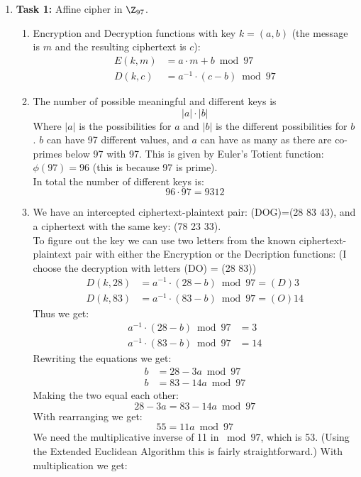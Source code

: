 \documentclass{article}
\begin{document}
\homeworktitle

\begin{enumerate}[label={}]
	\item \textbf{Task 1:} Affine cipher in $\Z_{97}$.
	\begin{enumerate}
		\item Encryption and Decryption functions with key $k=(a,b)$ (the message is $m$ and the resulting ciphertext is $c$):
		\begin{align*}
			E(k, m) &= a \cdot m + b \bmod 97\\
			D(k, c) &= a^{-1} \cdot (c - b) \bmod 97
		\end{align*}
		\item The number of possible meaningful and different keys is \[ \lvert a \rvert \cdot \lvert b \rvert \]
		Where $\lvert a \rvert$ is the possibilities for $a$ and $\lvert b \rvert$ is the different possibilities for $b$. $b$ can have 97 different values, and $a$ can have as many as there are co-primes below 97 with 97. This is given by Euler's Totient function: $\phi(97) = 96$ (this is because 97 is prime).\\
		In total the number of different keys is: 
		\[96 \cdot 97 = 9312\]
		\item We have an intercepted ciphertext-plaintext pair: (DOG)=(28 83 43), and a ciphertext with the same key: (78 23 33).\\
		To figure out the key we can use two letters from the known ciphertext-plaintext pair with either the Encryption or the Decription functions: (I choose the decryption with letters (DO) = (28 83))
		\begin{align*}
			D(k, 28) &= a^{-1} \cdot (28 - b) \bmod 97 = (D)3\\
			D(k, 83) &= a^{-1} \cdot (83 - b) \bmod 97 = (O)14
		\end{align*}
		Thus we get:
		\begin{align*}
				a^{-1} \cdot (28 - b) \bmod 97 &= 3\\
				a^{-1} \cdot (83 - b) \bmod 97 &= 14
		\end{align*}
		Rewriting the equations we get:
		\begin{align*}
			b &= 28 - 3a \bmod 97\\
			b &= 83 - 14a \bmod 97
		\end{align*}
		Making the two equal each other:
		\[28 - 3a = 83 - 14a \bmod 97\]
		With rearranging we get:
		\[55 = 11a \bmod 97\]
		We need the multiplicative inverse of 11 in $\bmod 97$, which is 53. (Using the Extended Euclidean Algorithm this is fairly straightforward.) With multiplication we get:

\end{enumerate}
\end{enumerate}
\end{document}
